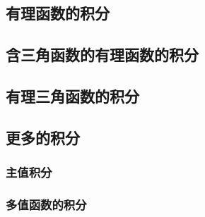     \subsection{有理函数的积分}
    \subsection{含三角函数的有理函数的积分}
    \subsection{有理三角函数的积分}
    \subsection{更多的积分}
        \subsubsection{主值积分}
        \subsubsection{多值函数的积分}
